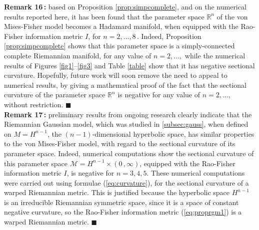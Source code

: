 \documentclass{svmult}
\begin{document}
\noindent \textbf{Remark 16\,:} based on Proposition \ref{prop:simpcomplete}, and on the numerical results reported here, it has been found that the parameter space $\mathbb{R}^n$ of the von Mises-Fisher model becomes a Hadamard manifold, when equipped with the Rao-Fisher information metric $I$, for $n = 2,\ldots,8$\,. Indeed, Proposition \ref{prop:simpcomplete} shows that this parameter space is a simply-connected complete Riemannian manifold, for any value of $n = 2,\ldots,$ while the numerical results of Figures \ref{fig1}--\ref{fig3} and Table \ref{table} show that it has negative sectional curvature. Hopefully, future work will soon remove the need to appeal to numerical results, by giving a mathematical proof  of the fact that the sectional curvature of the parameter space $\mathbb{R}^n$ is negative for any value of $n = 2,\ldots,$ without restriction. \hfill$\blacksquare$ \\[0.1cm]
\textbf{Remark 17\,:} preliminary results from ongoing research clearly indicate that the Riemannian Gaussian model, which was studied in \ref{subsec:gauss}, when defined on $M = H^{n-1}$, the $(n-1)$-dimensional hyperbolic space, has similar properties to the von Mises-Fisher model, with regard to the sectional curvature of its parameter space. Indeed, numerical computations show the sectional curvature of this parameter space $\mathcal{M} = H^{n-1} \times (0\,,\infty)$, equipped with the Rao-Fisher information metric $I$, is negative for $n = 3, 4, 5$. These numerical computations were carried out using formulae (\ref{eq:curvature}), for the sectional curvature of a warped Riemannian metric. This is justified because the hyperbolic space $H^{n-1}$ is an irreducible Riemannian symmetric space, since it is a space of constant negative curvature, so the Rao-Fisher information metric (\ref{eq:proprgm1}) is a warped Riemannian metric. \hfill$\blacksquare$ 
\end{document}

